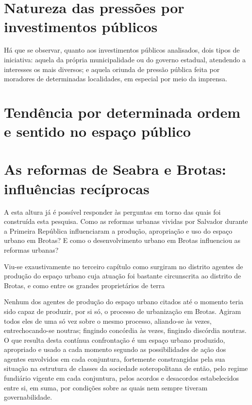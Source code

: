 \section{Natureza das pressões por investimentos públicos}\label{subsec:3.3.2}

Há que se observar, quanto aos investimentos públicos analisados, dois tipos de iniciativa: aquela da própria municipalidade ou do governo estadual, atendendo a interesses os mais diversos; e aquela oriunda de pressão pública feita por moradores de determinadas localidades, em especial por meio da imprensa.

\section{Tendência por determinada ordem e sentido no espaço público}\label{subsec:3.3.3}



\section[As reformas de Seabra e Brotas: influências recíprocas]{As reformas de Seabra e Brotas: influências recíprocas}\label{subsec:3.3.4}

A esta altura já é possível responder às perguntas em torno das quais foi construída esta pesquisa. Como as reformas urbanas vividas por Salvador durante a Primeira República influenciaram a produção, apropriação e uso do espaço urbano em Brotas? E como o desenvolvimento urbano em Brotas influenciou as reformas urbanas?

Viu-se exaustivamente no terceiro capítulo como surgiram no distrito agentes de produção do espaço urbano cuja atuação foi bastante circunscrita ao distrito de Brotas, e como entre os grandes proprietários de terra

Nenhum dos agentes de produção do espaço urbano citados até o momento teria sido capaz de produzir, por si só, o processo de urbanização em Brotas. Agiram todos eles de uma só vez sobre o mesmo processo, aliando-se às vezes, entrechocando-se noutras; fingindo concórdia às vezes, fingindo discórdia noutras. O que resulta desta contínua confrontação é um espaço urbano produzido, apropriado e usado a cada momento segundo as possibilidades de ação dos agentes envolvidos em cada conjuntura, fortemente constrangidas pela sua situação na estrutura de classes da sociedade soteropolitana de então, pelo regime fundiário vigente em cada conjuntura, pelos acordos e desacordos estabelecidos entre si, em suma, por condições sobre as quais nem sempre tiveram governabilidade.

